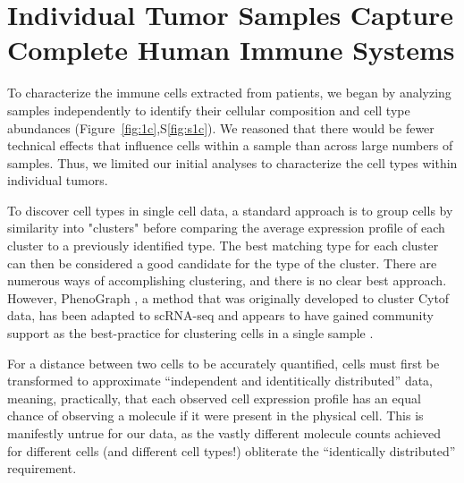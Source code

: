 \section{Individual Tumor Samples Capture Complete Human Immune Systems}

To characterize the immune cells extracted from patients, we began by analyzing samples independently to identify their cellular composition and cell type abundances (Figure~\ref{fig:1c},S\ref{fig:s1c}).
We reasoned that there would be fewer technical effects that influence cells within a sample than across large numbers of samples. 
Thus, we limited our initial analyses to characterize the cell types within individual tumors. 

To discover cell types in single cell data, a standard approach is to group cells by similarity into "clusters" before comparing the average expression profile of each cluster to a previously identified type.
The best matching type for each cluster can then be considered a good candidate for the type of the cluster. 
There are numerous ways of accomplishing clustering, and there is no clear best approach. 
However, PhenoGraph \citep{Levine2015}, a method that was originally developed to cluster Cytof data, has been adapted to scRNA-seq and appears to have gained community support as the best-practice for clustering cells in a single sample \cite{Shekhar2016,Butler2017}. 

For a distance between two cells to be accurately quantified, cells must first be transformed to approximate ``independent and identitically distributed'' data, meaning, practically, that each observed cell expression profile has an equal chance of observing a molecule if it were present in the physical cell. 
This is manifestly untrue for our data, as the vastly different molecule counts achieved for different cells (and different cell types!) obliterate the ``identically distributed'' requirement. %

